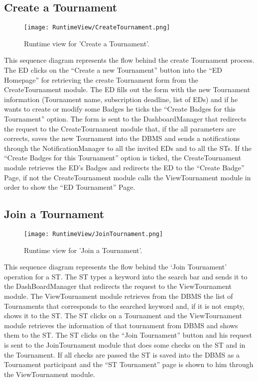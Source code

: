 \subsection{Create a Tournament}
\begin{figure}[H]
    \begin{center}
        \texttt{[image: RuntimeView/CreateTournament.png]}
        \caption{Runtime view for 'Create a Tournament'.}
        \label{fig:runtime_createtournament}%
    \end{center}
\end{figure}
This sequence diagram represents the flow behind the create Tournament process.
The ED clicks on the “Create a new Tournament” button into the “ED Homepage” for retrieving the create Tournament form from the CreateTournament module. The ED fills out the form with the new Tournament information (Tournament name, subscription deadline, list of EDs) and if he wants to create or modify some Badges he ticks the “Create Badges for this Tournament” option. The form is sent to the DashboardManager that redirects the request to the CreateTournament module that, if the all parameters are corrects, saves the new Tournament into the DBMS and sends a notifications through the NotificationManager to all the invited EDs and to all the STs.
If the “Create Badges for this Tournament” option is ticked, the  CreateTournament module retrieves the ED’s Badges and redirects the ED to the “Create Badge” Page, if not the CreateTournament module calls the ViewTournament module in order to show the “ED Tournament” Page.


\subsection{Join a Tournament}
\begin{figure}[H]
    \begin{center}
        \texttt{[image: RuntimeView/JoinTournament.png]}
        \caption{Runtime view for 'Join a Tournament'.}
        \label{fig:runtime_jointournament}%
    \end{center}
\end{figure}
This sequence diagram represents the flow behind the ‘Join Tournament’ operation for a ST.
The ST types a keyword into the search bar and sends it to the DashBoardManager that redirects the request to the ViewTournament module.
The ViewTournament module retrieves from the DBMS the list of Tournaments that corresponds to the searched keyword and, if it is not empty, shows it to the ST. The ST clicks on a Tournament and the ViewTournament module retrieves the information of that tournament from DBMS and shows them to the ST. The ST clicks on the “Join Tournament” button and his request is sent to the JoinTournament module that does some checks on the ST and in the Tournament. If all checks are passed the ST is saved into the DBMS as a Tournament participant and the “ST Tournament” page is shown to him through the ViewTournament module.



